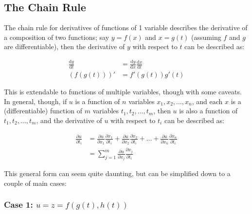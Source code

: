 \documentclass[12pt]{article}
\begin{document}


\subsection{The Chain Rule}

The chain rule for derivatives of functions of 1 variable describes the derivative of a composition of two functions; say $y=f(x)$ and $x=g(t)$ (assuming $f$ and $g$ are differentiable), then the derivative of $y$ with respect to $t$ can be described as:

\begin{equation}
    \begin{split}
       \frac{\text{d}y}{\text{d}t} &= \frac{\text{d}y}{\text{d}x}\frac{\text{d}x}{\text{d}t}\\
        (f(g(t)))' &= f'(g(t))g'(t)
    \end{split}
\end{equation}

This is extendable to functions of multiple variables, though with some caveats. In general, though, if $u$ is a function of $n$ variables $x_1, x_2, \dots, x_n$, and each $x$ is a (differentiable) function of $m$ variables $t_1, t_2, \dots, t_m$, then $u$ is also a function of $t_1, t_2, \dots, t_m$, and the derivative of $u$ with respect to $t_i$ can be described as:

\begin{equation}
    \begin{split}
        \frac{\partial u}{\partial t_i} &= \frac{\partial u}{\partial x_1}\frac{\partial x_1}{\partial t_i} + \frac{\partial u}{\partial x_2}\frac{\partial x_2}{\partial t_i} + \dots + \frac{\partial u}{\partial x_n}\frac{\partial x_n}{\partial t_i}\\
        &= \sum_{j=1}^m \frac{\partial u}{\partial x_j}\frac{\partial x_j}{\partial t_i}
    \end{split}
\end{equation}

This general form can seem quite daunting, but can be simplified down to a couple of main cases:

\subsubsection*{\texorpdfstring{Case 1: $u=z=f(g(t),h(t))$}{A function of two parametrically defined functions in terms of a single variable}}
\end{document}
